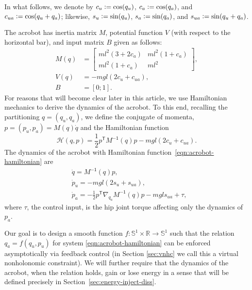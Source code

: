 \documentclass[journal,twoside,web, twocolumn]{ieeecolor}
\newcommand*{\tpose}{^\mathsf{T}}
\newcommand*{\R}{\mathbb{R}}
\newcommand*{\Sone}{\mathbb{S}^1}
\newcommand*{\Minv}{M^\mathsf{-1}}
\newcommand*{\eqdef}{\vcentcolon=}
\begin{document}
In what follows, we denote by \(c_u \eqdef \cos(q_u)\), \(c_a \eqdef \cos(q_a)\), and \(c_{ua} \eqdef \cos(q_u + q_a)\); likewise, \(s_u \eqdef \sin(q_u)\), \(s_a \eqdef \sin(q_a)\), and \(s_{ua} \eqdef \sin(q_u + q_a)\).



The acrobot has inertia matrix \(M\), potential function \(V\) (with respect to the horizontal bar), and input matrix \(B\) given as follows:
\begin{align}\label{eqn:acrobot-inertia}
    M(q) &= \begin{bmatrix}
        ml^2\left(3+2 c_a\right) & 
        ml^2\left(1+ c_a \right) \\
        ml^2\left(1+ c_a\right) &
        ml^2
    \end{bmatrix} 
    , \\
    \label{eqn:acrobot-potential}
    V(q) &= -mgl\left(2 c_u + c_{ua}\right)
    , \\
    \label{eqn:acrobot-B}
    B &= [0;1]
    .
\end{align}
For reasons that will become clear later in this article, we
use Hamiltonian mechanics to derive the dynamics of the acrobot. 
To this end, recalling the partitioning  \(q= (q_u,q_a)\), we define the conjugate of momenta, \(p = (p_u,p_a) = M(q)\dot{q}\) and the Hamiltonian function
\begin{equation}\label{eqn:acrobot-hamiltonian}
    \mathcal{H}(q,p) = \frac{1}{2}p\tpose \Minv(q) p -
   mgl\left(2 c_u + c_{ua}\right).
  \end{equation}
The dynamics of the
acrobot with Hamiltonian function~\eqref{eqn:acrobot-hamiltonian} are
\begin{equation}
  \label{eq:acrobot:model}
  \begin{aligned}
&    \dot{q} = \Minv(q) p,\\
&    \dot{p}_u = -mgl\left(2s_u + s_{ua}\right),\\
&     \dot{p}_a =-\frac{1}{2}p\tpose \nabla_{q_a}\Minv(q) p - m g l s_{ua} + \tau,
  \end{aligned}
\end{equation}
where \(\tau\), the control input, is the hip joint torque affecting only the dynamics of
\(p_a\).

Our goal is to design a smooth function \(f : \Sone \times \R \to \Sone\) such that the
relation \(q_a = f(q_u,p_u)\) for system \eqref{eqn:acrobot-hamiltonian} can be
enforced asymptotically via feedback control (in Section \ref{sec:vnhc} we call
this a  virtual nonholonomic constraint).   We will further require that the
dynamics of the acrobot, when the relation holds, gain or lose energy in a sense
that will be defined precisely in Section~\ref{sec:energy-inject-diss}.
\end{document}
